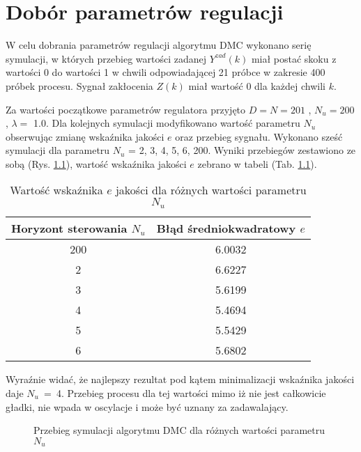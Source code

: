 \chapter{Dobór parametrów regulacji}

W celu dobrania parametrów regulacji algorytmu DMC wykonano serię symulacji, w których przebieg wartości zadanej $Y^{zad}(k)$ miał postać skoku z wartości \num{0} do wartości \num{1} w chwili odpowiadającej 21 próbce w zakresie 400 próbek procesu. Sygnał zakłocenia $Z(k)$ miał wartość \num{0} dla każdej chwili $k$.

Za wartości początkowe parametrów regulatora przyjęto $D=N=201$ , $N_u = 200$ , $\lambda =$ \num{1.0}. Dla kolejnych symulacji modyfikowano wartość parametru $N_u$ obserwując zmianę wskaźnika jakości $e$ oraz przebieg sygnału. Wykonano sześć symulacji dla parametru $N_u$ = 2, 3, 4, 5, 6, 200. Wyniki przebiegów zestawiono ze sobą (Rys. \ref{Nu}), wartość wskaźnika jakości $e$ zebrano w tabeli (Tab. \ref{eNu}).

\begin{table}
	[b] \caption{Wartość wskaźnika $e$ jakości dla różnych wartości parametru $N_u$}
	\label{eNu}
	\centering
	\begin{small}
		\begin{tabular}{|c|c|}
			\hline 
			Horyzont sterowania $N_u$ & Błąd średniokwadratowy $e$ \\ 
			\hline 
			200 & \num{6.0032} \\ 
			\hline 
			2 & \num{6.6227} \\ 
			\hline 
			3 & \num{5.6199} \\ 
			\hline 
			4 & \num{5.4694} \\ 
			\hline 
			5 & \num{5.5429} \\ 
			\hline 
			6 & \num{5.6802} \\ 
			\hline 
		\end{tabular}
	\end{small}
\end{table}

Wyraźnie widać, że najlepszy rezultat pod kątem minimalizacji wskaźnika jakości daje $N_u$~=~4. Przebieg procesu dla tej wartości mimo iż nie jest całkowicie gładki, nie wpada w oscylacje i może być uznany za zadawalający.

\begin{figure}
	
	\centering
	\caption{ Przebieg symulacji algorytmu DMC dla różnych wartości  parametru $N_u$ }
	
	\label{Nu}
\end{figure}

